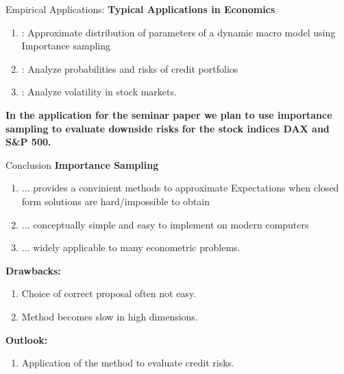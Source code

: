 \documentclass[10pt]{beamer}
\begin{document}
\begin{frame}{Empirical Applications:}
\textbf{Typical Applications in Economics}
\begin{enumerate}
    \item \cite{Herbst2014}: Approximate distribution of parameters of a dynamic macro model using Importance sampling
    \item \cite{Glasserman2005}: Analyze probabilities and risks of credit portfolios
    \item \cite {Doucet2001}: Analyze volatility in stock markets.
\end{enumerate}
\vspace{1cm}
\large{\textbf{In the application for the seminar paper we plan to use importance sampling to evaluate downside risks for the stock indices DAX and S\&P 500. }}
\end{frame}

\begin{frame}{Conclusion}
\textbf{Importance Sampling}
\begin{enumerate}
    \item ... provides a convinient methods to approximate Expectations when closed form solutions are hard/impossible to obtain
    \item ... conceptually simple and easy to implement on modern computers
    \item ... widely applicable to many econometric problems.
\end{enumerate}
\textbf{Drawbacks:} 
\begin{enumerate}
    \item Choice of correct proposal often not easy.
    \item Method becomes slow in high dimensions. 
\end{enumerate}
\textbf{Outlook:} 
\begin{enumerate}
\item Application of the method to evaluate credit risks.
\end{enumerate}

\end{frame}
\end{document}
